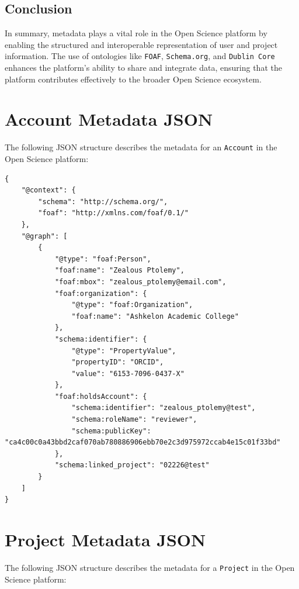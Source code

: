 \documentclass{article}
\begin{document}
\subsection{Conclusion}
In summary, metadata plays a vital role in the Open Science platform by enabling the structured and interoperable representation of user and project information. The use of ontologies like \texttt{FOAF}, \texttt{Schema.org}, and \texttt{Dublin Core} enhances the platform's ability to share and integrate data, ensuring that the platform contributes effectively to the broader Open Science ecosystem.


\section{Account Metadata JSON}

The following JSON structure describes the metadata for an \texttt{Account} in the Open Science platform:

\begin{verbatim}
{
    "@context": {
        "schema": "http://schema.org/",
        "foaf": "http://xmlns.com/foaf/0.1/"
    },
    "@graph": [
        {
            "@type": "foaf:Person",
            "foaf:name": "Zealous Ptolemy",
            "foaf:mbox": "zealous_ptolemy@email.com",
            "foaf:organization": {
                "@type": "foaf:Organization",
                "foaf:name": "Ashkelon Academic College"
            },
            "schema:identifier": {
                "@type": "PropertyValue",
                "propertyID": "ORCID",
                "value": "6153-7096-0437-X"
            },
            "foaf:holdsAccount": {
                "schema:identifier": "zealous_ptolemy@test",
                "schema:roleName": "reviewer",
                "schema:publicKey": "ca4c00c0a43bbd2caf070ab780886906ebb70e2c3d975972ccab4e15c01f33bd"
            },
            "schema:linked_project": "02226@test"
        }
    ]
}
\end{verbatim}

\section{Project Metadata JSON}

The following JSON structure describes the metadata for a \texttt{Project} in the Open Science platform:
\end{document}
